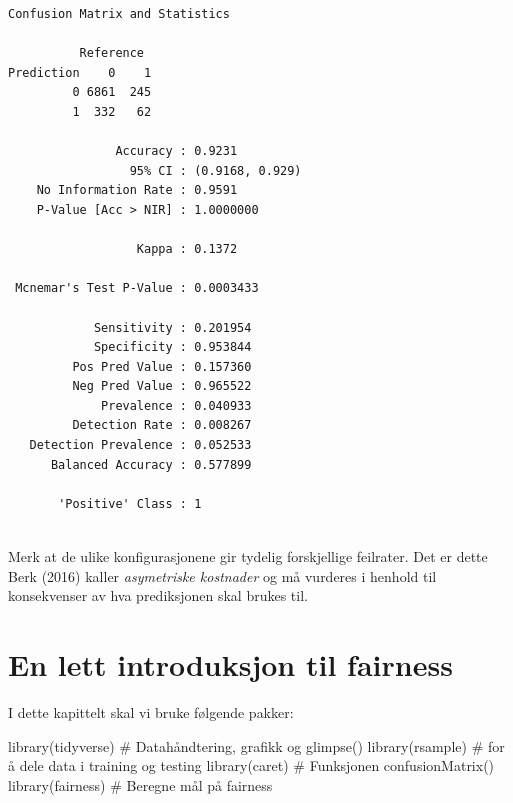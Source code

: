 \documentclass[
  letterpaper,
  DIV=11,
  numbers=noendperiod]{scrreprt}
\newenvironment{Shaded}{\begin{snugshade}}{\end{snugshade}}
\newcommand{\CommentTok}[1]{\textcolor[rgb]{0.37,0.37,0.37}{#1}}
\newcommand{\FunctionTok}[1]{\textcolor[rgb]{0.28,0.35,0.67}{#1}}
\newcommand{\NormalTok}[1]{\textcolor[rgb]{0.00,0.23,0.31}{#1}}
\begin{document}
\begin{verbatim}
Confusion Matrix and Statistics

          Reference
Prediction    0    1
         0 6861  245
         1  332   62
                                         
               Accuracy : 0.9231         
                 95% CI : (0.9168, 0.929)
    No Information Rate : 0.9591         
    P-Value [Acc > NIR] : 1.0000000      
                                         
                  Kappa : 0.1372         
                                         
 Mcnemar's Test P-Value : 0.0003433      
                                         
            Sensitivity : 0.201954       
            Specificity : 0.953844       
         Pos Pred Value : 0.157360       
         Neg Pred Value : 0.965522       
             Prevalence : 0.040933       
         Detection Rate : 0.008267       
   Detection Prevalence : 0.052533       
      Balanced Accuracy : 0.577899       
                                         
       'Positive' Class : 1              
                                         
\end{verbatim}

Merk at de ulike konfigurasjonene gir tydelig forskjellige feilrater.
Det er dette Berk (2016) kaller \emph{asymetriske kostnader} og må
vurderes i henhold til konsekvenser av hva prediksjonen skal brukes til.


\chapter{En lett introduksjon til
fairness}\label{en-lett-introduksjon-til-fairness}

I dette kapittelt skal vi bruke følgende pakker:

\begin{Shaded}
\begin{Highlighting}[]
\FunctionTok{library}\NormalTok{(tidyverse)   }\CommentTok{\# Datahåndtering, grafikk og glimpse()}
\FunctionTok{library}\NormalTok{(rsample)     }\CommentTok{\# for å dele data i training og testing}
\FunctionTok{library}\NormalTok{(caret)       }\CommentTok{\# Funksjonen confusionMatrix()}
\FunctionTok{library}\NormalTok{(fairness)    }\CommentTok{\# Beregne mål på fairness}
\end{Highlighting}
\end{Shaded}
\end{document}
